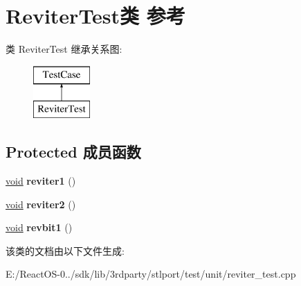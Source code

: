 \hypertarget{class_reviter_test}{}\section{Reviter\+Test类 参考}
\label{class_reviter_test}
类 Reviter\+Test 继承关系图\+:\begin{figure}[H]
\begin{center}
\leavevmode
\includegraphics[height=2.000000cm]{class_reviter_test}
\end{center}
\end{figure}
\subsection*{Protected 成员函数}
\begin{DoxyCompactItemize}
\item 
\mbox{\label{class_reviter_test_a013486a0e69ba0030e171c6bdbdb0aee}} 
\hyperlink{interfacevoid}{void} {\bfseries reviter1} ()
\item 
\mbox{\label{class_reviter_test_a126ef949dcb34b753d7242809b3aaf53}} 
\hyperlink{interfacevoid}{void} {\bfseries reviter2} ()
\item 
\mbox{\label{class_reviter_test_ac654e1af2dafb12f82085d269ab531a8}} 
\hyperlink{interfacevoid}{void} {\bfseries revbit1} ()
\end{DoxyCompactItemize}


该类的文档由以下文件生成\+:\begin{DoxyCompactItemize}
\item 
E\+:/\+React\+O\+S-\/0../sdk/lib/3rdparty/stlport/test/unit/reviter\+\_\+test.\+cpp\end{DoxyCompactItemize}
